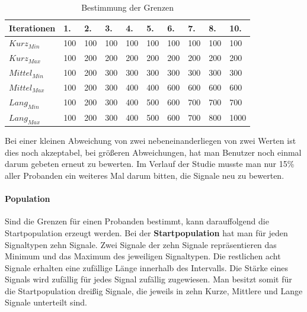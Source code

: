 \begin{table}[]
\centering
\caption{Bestimmung der Grenzen}
\label{bestimmunggrenzen}
\begin{tabular}{l|l|l|l|l|l|l|l|l|l}
Iterationen            & 1. & 2. & 3. & 4. & 5. & 6. & 7. & 8. & 10. \\ \hline
$Kurz_{Min}$   & 100          & 100          & 100          & 100          & 100          & 100          & 100          & 100          & 100           \\ \hline
$Kurz_{Max}$   & 100          & 200          & 200          & 200          & 200          & 200          & 200          & 200          & 200           \\ \hline
$Mittel_{Min}$ & 100          & 200          & 300          & 300          & 300          & 300          & 300          & 300          & 300           \\ \hline
$Mittel_{Max}$ & 100          & 200          & 300          & 400          & 400          & 600          & 600          & 600          & 600           \\ \hline
$Lang_{Min}$   & 100          & 200          & 300          & 400          & 500          & 600          & 700          & 700          & 700           \\ \hline
$Lang_{Max}$   & 100          & 200          & 300          & 400          & 500          & 600          & 700          & 800          & 1000          \\ %
\end{tabular}
\end{table}

Bei einer kleinen Abweichung von zwei nebeneinanderliegen von zwei Werten ist dies noch akzeptabel, bei gr{\"o}{\ss}eren Abweichungen, hat man Benutzer noch einmal darum gebeten erneut zu bewerten. Im Verlauf der Studie musste man nur 15\% aller Probanden ein weiteres Mal darum bitten, die Signale neu zu bewerten. 

\paragraph{Population}

Sind die Grenzen f{\"u}r einen Probanden bestimmt, kann darauffolgend die Startpopulation erzeugt werden.
Bei der \textbf{Startpopulation} hat man f{\"u}r jeden Signaltypen zehn Signale. 
Zwei Signale der zehn Signale repr{\"a}sentieren das Minimum und das Maximum des jeweiligen Signaltypen.
Die restlichen acht Signale erhalten eine zuf{\"a}llige L{\"a}nge innerhalb des Intervalls. Die St{\"a}rke eines Signals wird zuf{\"a}llig f{\"u}r jedes Signal zuf{\"a}llig zugewiesen. 
Man besitzt somit f{\"u}r die Startpopulation drei{\ss}ig Signale, die jeweils in zehn Kurze, Mittlere und Lange Signale unterteilt sind. 

